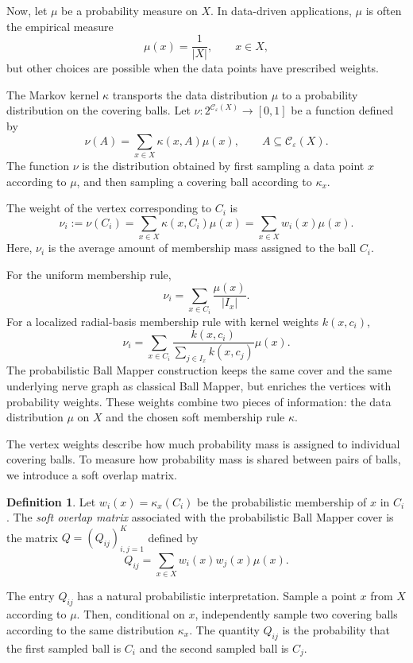 \documentclass[9pt,a4paper,twocolumn,twoside]{extarticle}
\theoremstyle{definition}
\newtheorem{definition}[theorem]{Definition}
\begin{document}
Now, let $\mu$ be a probability measure on $X$. In data-driven applications, $\mu$ is often the empirical measure
\[
\mu({x})=\frac{1}{|X|}, \qquad x\in X,
\]
but other choices are possible when the data points have prescribed weights.

The Markov kernel $\kappa$ transports the data distribution $\mu$ to a probability distribution on the covering balls. Let $\nu:2^{\mathcal C_\varepsilon(X)}\to[0,1]$
be a function defined by
\[
\nu(A) = \sum_{x\in X}\kappa(x,A)\mu({x}), \qquad A\subseteq \mathcal C_\varepsilon(X).
\]
The function $\nu$ is the distribution obtained by first sampling a data point $x$ according to $\mu$, and then sampling a covering ball according to $\kappa_x$.

The weight of the vertex corresponding to $C_i$ is
\[
\nu_i := \nu({C_i}) =\sum_{x\in X}\kappa(x,{C_i})\mu({x}) = \sum_{x\in X}w_i(x)\mu({x}).
\]
Here, $\nu_i$ is the average amount of membership mass assigned to the ball $C_i$.

For the uniform membership rule,
\[
\nu_i = \sum_{x\in C_i}\frac{\mu({x})}{|I_x|}.
\]
For a localized radial-basis membership rule with kernel weights $k(x,c_i)$,
\[
\nu_i = \sum_{x\in C_i}\frac{k(x,c_i)}{\sum_{j\in I_x}k(x,c_j)}\mu({x}).
\]
The probabilistic Ball Mapper construction keeps the same cover and the same underlying nerve graph as classical Ball Mapper, but enriches the vertices with probability weights. These weights combine two pieces of information: the data distribution $\mu$ on $X$ and the chosen soft membership rule $\kappa$.

The vertex weights describe how much probability mass is assigned to individual covering balls. To measure how probability mass is shared between pairs of balls, we introduce a soft overlap matrix.

\begin{definition}
Let $w_i(x)=\kappa_x({C_i})$ be the probabilistic membership of $x$ in $C_i$. The \emph{soft overlap matrix} associated with the probabilistic Ball Mapper cover is the matrix
$Q=(Q_{ij})_{i,j=1}^K$ defined by
\[
Q_{ij} = \sum_{x\in X} w_i(x)w_j(x)\mu({x}).
\]
\end{definition}

The entry $Q_{ij}$ has a natural probabilistic interpretation. Sample a point $x$ from $X$ according to $\mu$. Then, conditional on $x$, independently sample two covering balls according to the same distribution $\kappa_x$. The quantity $Q_{ij}$ is the probability that the first sampled ball is $C_i$ and the second sampled ball is $C_j$.
\end{document}
